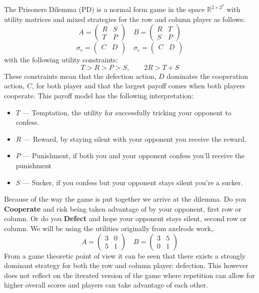The Prisoners Dilemma (PD) is a normal form game in the space $\mathbb{R}^{{2\times 2}^2}$ with utility matrices and mixed strategies for the row and column player as follows:
$$
    A=\begin{pmatrix}R & S\\ T & P\end{pmatrix}\quad
    B=\begin{pmatrix}R & T\\ S & P\end{pmatrix}
$$
$$
    \sigma_r=\begin{pmatrix}C & D\\ \end{pmatrix}\quad
    \sigma_c=\begin{pmatrix}C & D\\ \end{pmatrix}
$$
with the following utility constraints:
$$T>R>P>S, \qquad 2R>T+S$$
These constraints mean that the defection action, $D$ dominates the cooperation action, $C$, for both player and that the largest payoff comes when both players cooperate. This payoff model has the following interpretation:
\begin{itemize}
    \item $T$ --- Temptation, the utility for successfully tricking your opponent to confess.
    \item $R$ --- Reward, by staying silent with your opponent you receive the reward.
    \item $P$ --- Punishment, if both you and your opponent confess you'll receive the punishment
    \item $S$ --- Sucker, if you confess but your opponent stays silent you're a sucker.
\end{itemize}
Because of the way the game is put together we arrive at the dilemma.
Do you \textbf{Cooperate} and risk being taken advantage of by your opponent, first row or column.
Or do you \textbf{Defect} and hope your opponent stays silent, second row or column.
We will be using the utilities originally from axelrods work,\cite{axelrod1980effective}.
$$
    A=\begin{pmatrix}3 & 0 \\ 5 & 1\end{pmatrix}\quad
    B=\begin{pmatrix}3 & 5 \\ 0 & 1\end{pmatrix}
$$    
From a game theoretic point of view it can be seen that there exists a strongly dominant strategy for both the row and column player: defection.
This however does not reflect on the iterated version of the game where repetition can allow for higher overall scores and players can take advantage of each other.

